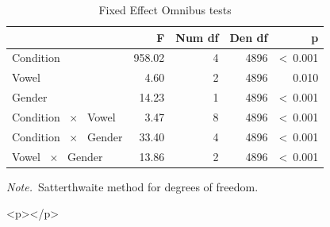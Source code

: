 \documentclass[a4paper,man,hidelinks,floatsintext]{apa7}
\begin{document}
    
\begin{table}[!htbp]
\caption{Fixed Effect Omnibus tests}
\label{tab:Table_2}
\begin{adjustbox}{max size={\columnwidth}{\textheight}}
\centering
\begin{tabular}{lrrrr}
\hline
~                           &      F & Num df & Den df &               p \\
\hline
Condition                   & 958.02 &      4 &   4896 & \textless~0.001 \\
Vowel                       &   4.60 &      2 &   4896 &           0.010 \\
Gender                      &  14.23 &      1 &   4896 & \textless~0.001 \\
Condition ~$\times$~ Vowel  &   3.47 &      8 &   4896 & \textless~0.001 \\
Condition ~$\times$~ Gender &  33.40 &      4 &   4896 & \textless~0.001 \\
Vowel ~$\times$~ Gender     &  13.86 &      2 &   4896 & \textless~0.001 \\
\hline
\end{tabular}
\end{adjustbox}
\begin{tablenotes} {
\small
\textit{Note.}~Satterthwaite method for degrees of freedom. \\
}
\end{tablenotes}
\end{table}
      
        <p></p>
      
\end{document}
